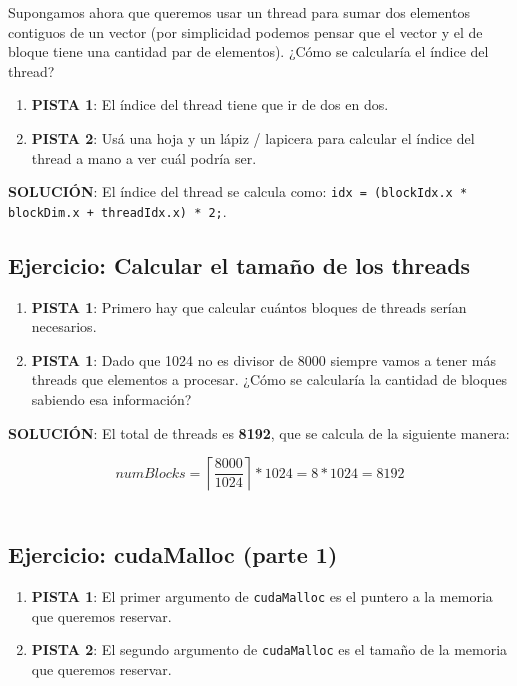 Supongamos ahora que queremos usar un thread para sumar dos elementos contiguos de un vector (por simplicidad podemos
pensar que el vector y el de bloque tiene una cantidad par de elementos). ¿Cómo se calcularía el índice del thread?

\begin{enumerate}
  \item \textbf{PISTA 1}: El índice del thread tiene que ir de dos en dos. 

  \item \textbf{PISTA 2}: Usá una hoja y un lápiz / lapicera para calcular el índice del thread a mano a ver cuál podría
    ser.
\end{enumerate}

\textbf{SOLUCIÓN}: El índice del thread se calcula como: \texttt{idx = (blockIdx.x * blockDim.x + threadIdx.x) * 2;}.

\subsection{Ejercicio: Calcular el tamaño de los threads}

\begin{enumerate}
  \item \textbf{PISTA 1}: Primero hay que calcular cuántos bloques de threads serían necesarios.

  \item \textbf{PISTA 1}: Dado que 1024 no es divisor de 8000 siempre vamos a tener más threads que elementos a
    procesar. ¿Cómo se calcularía la cantidad de bloques sabiendo esa información?
\end{enumerate}

\textbf{SOLUCIÓN}: El total de threads es \textbf{8192}, que se calcula de la siguiente manera:

\begin{equation}
  numBlocks = \left\lceil \frac{8000}{1024} \right\rceil * 1024 = 8 * 1024 = 8192
\end{equation} \\

\subsection{Ejercicio: cudaMalloc (parte 1)}

\begin{enumerate}
  \item \textbf{PISTA 1}: El primer argumento de \texttt{cudaMalloc} es el puntero a la memoria que queremos reservar.

  \item \textbf{PISTA 2}: El segundo argumento de \texttt{cudaMalloc} es el tamaño de la memoria que queremos reservar.
\end{enumerate}

